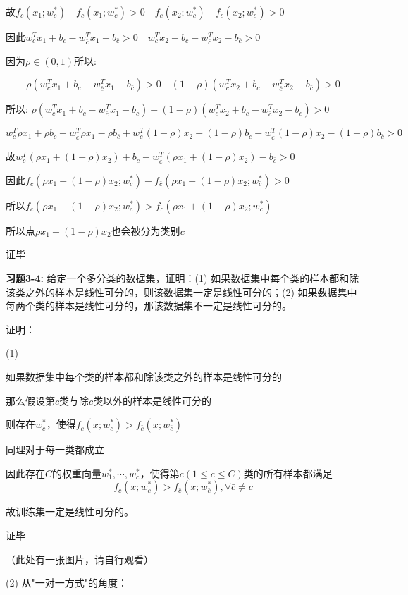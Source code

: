故$f_c(x_1; w_c^*) \quad f_c(x_1; w_{\bar{c}}^*) > 0 \quad f_c(x_2; w_c^*) \quad f_{\bar{c}}(x_2; w_{\bar{c}}^*) > 0$

因此$w_c^T x_1 + b_c - w_{\bar{c}}^T x_1 - b_{\bar{c}} > 0 \quad w_c^T x_2 + b_c - w_{\bar{c}}^T x_2 - b_{\bar{c}} > 0$

因为$\rho \in (0,1)$所以:

\[\rho(w_c^T x_1 + b_c - w_{\bar{c}}^T x_1 - b_{\bar{c}}) > 0 \quad (1-\rho)(w_c^T x_2 + b_c - w_{\bar{c}}^T x_2 - b_{\bar{c}}) > 0\]

所以: $\rho(w_c^T x_1 + b_c - w_{\bar{c}}^T x_1 - b_{\bar{c}}) + (1-\rho)(w_c^T x_2 + b_c - w_{\bar{c}}^T x_2 - b_{\bar{c}}) > 0$

\[w_c^T \rho x_1 + \rho b_c - w_{\bar{c}}^T \rho x_1 - \rho b_{\bar{c}} + w_c^T(1-\rho)x_2 + (1-\rho)b_c - w_{\bar{c}}^T(1-\rho)x_2 - (1-\rho)b_{\bar{c}} > 0\]

故$w_c^T(\rho x_1 + (1-\rho)x_2) + b_c - w_{\bar{c}}^T(\rho x_1 + (1-\rho)x_2) - b_{\bar{c}} > 0$

因此$f_c(\rho x_1 + (1-\rho)x_2; w_c^*) - f_{\bar{c}}(\rho x_1 + (1-\rho)x_2; w_{\bar{c}}^*) > 0$

所以$f_c(\rho x_1 + (1-\rho)x_2; w_c^*) > f_{\bar{c}}(\rho x_1 + (1-\rho)x_2; w_{\bar{c}}^*)$

所以点$\rho x_1 + (1-\rho)x_2$也会被分为类别$c$

证毕


\noindent\textbf{习题3-4:} 给定一个多分类的数据集，证明：(1) 如果数据集中每个类的样本都和除该类之外的样本是线性可分的，则该数据集一定是线性可分的；(2) 如果数据集中每两个类的样本是线性可分的，那该数据集不一定是线性可分的。

证明：

(1)

如果数据集中每个类的样本都和除该类之外的样本是线性可分的

那么假设第$c$类与除$c$类以外的样本是线性可分的

则存在$w_c^*$，使得$f_c(x; w_c^*) > f_{\bar{c}}(x; w_{\bar{c}}^*)$

同理对于每一类都成立

因此存在$C$的权重向量$w_1^*, \cdots, w_c^*$，使得第$c(1 \leq c \leq C)$类的所有样本都满足
\[f_c(x; w_c^*) > f_{\bar{c}}(x; w_{\bar{c}}^*), \forall \bar{c} \neq c\]

故训练集一定是线性可分的。

证毕

（此处有一张图片，请自行观看）

(2) 从"一对一方式"的角度：

